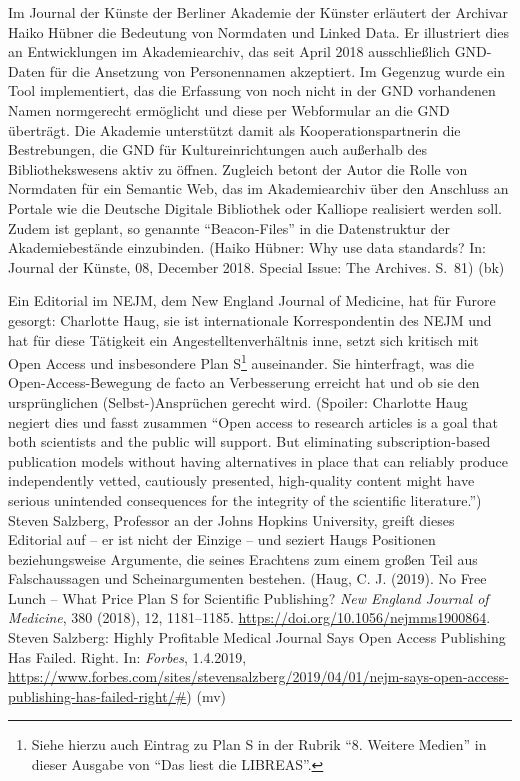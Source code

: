\documentclass[a4paper,
fontsize=11pt,
oneside,
numbers=noperiodatend,
parskip=half-,
bibliography=totoc,
final
]{scrartcl}
\begin{document}
Im Journal der Künste der Berliner Akademie der Künster erläutert der
Archivar Haiko Hübner die Bedeutung von Normdaten und Linked Data. Er
illustriert dies an Entwicklungen im Akademiearchiv, das seit April 2018
ausschließlich GND-Daten für die Ansetzung von Personennamen akzeptiert.
Im Gegenzug wurde ein Tool implementiert, das die Erfassung von noch
nicht in der GND vorhandenen Namen normgerecht ermöglicht und diese per
Webformular an die GND überträgt. Die Akademie unterstützt damit als
Kooperationspartnerin die Bestrebungen, die GND für Kultureinrichtungen
auch außerhalb des Bibliothekswesens aktiv zu öffnen. Zugleich betont
der Autor die Rolle von Normdaten für ein Semantic Web, das im
Akademiearchiv über den Anschluss an Portale wie die Deutsche Digitale
Bibliothek oder Kalliope realisiert werden soll. Zudem ist geplant, so
genannte \enquote{Beacon-Files} in die Datenstruktur der
Akademiebestände einzubinden. (Haiko Hübner: Why use data standards? In:
Journal der Künste, 08, December 2018. Special Issue: The Archives.
S.~81) (bk)

Ein Editorial im NEJM, dem New England Journal of Medicine, hat für
Furore gesorgt: Charlotte Haug, sie ist internationale Korrespondentin
des NEJM und hat für diese Tätigkeit ein Angestelltenverhältnis inne,
setzt sich kritisch mit Open Access und insbesondere Plan S\footnote{Siehe
  hierzu auch Eintrag zu Plan S in der Rubrik \enquote{8. Weitere
  Medien} in dieser Ausgabe von \enquote{Das liest die LIBREAS}.}
auseinander. Sie hinterfragt, was die Open-Access-Bewegung de facto an
Verbesserung erreicht hat und ob sie den ursprünglichen
(Selbst-)Ansprüchen gerecht wird. (Spoiler: Charlotte Haug negiert dies
und fasst zusammen \enquote{Open access to research articles is a goal
that both scientists and the public will support. But eliminating
subscription-based publication models without having alternatives in
place that can reliably produce independently vetted, cautiously
presented, high-quality content might have serious unintended
consequences for the integrity of the scientific literature.}) Steven
Salzberg, Professor an der Johns Hopkins University, greift dieses
Editorial auf -- er ist nicht der Einzige -- und seziert Haugs
Positionen beziehungsweise Argumente, die seines Erachtens zum einem
großen Teil aus Falschaussagen und Scheinargumenten bestehen. (Haug, C.
J. (2019). No Free Lunch -- What Price Plan S for Scientific
Publishing? \emph{New England Journal of Medicine}, 380 (2018), 12,
1181--1185. \url{https://doi.org/10.1056/nejmms1900864}. Steven
Salzberg: Highly Profitable Medical Journal Says Open Access Publishing
Has Failed. Right. In: \emph{Forbes}, 1.4.2019,
\url{https://www.forbes.com/sites/stevensalzberg/2019/04/01/nejm-says-open-access-publishing-has-failed-right/\#})
(mv)
\end{document}
